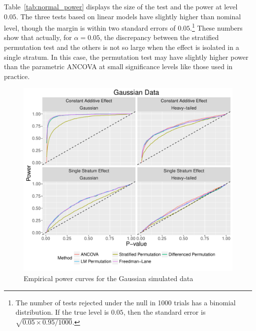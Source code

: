 \documentclass[11pt]{article}
\begin{document}
Table~\ref{tab:normal_power} displays the size of the test and the power at level $0.05$.
The three tests based on linear models have slightly higher than nominal level, though the margin is within two standard errors of $0.05$.\footnote{
The number of tests rejected under the null in 1000 trials has a binomial distribution.
If the true level is $0.05$, then the standard error is $\sqrt{0.05 \times 0.95/1000}$.}
These numbers show that actually, for $\alpha=0.05$, the discrepancy between the stratified permutation test and the others is not so large when the effect is isolated in a single stratum.
In this case, the permutation test may have slightly higher power than the parametric ANCOVA at small significance levels like those used in practice.
\begin{figure}[h]
\centering
\includegraphics[width = \textwidth]{fig/normal_simulation_power}
\caption{Empirical power curves for the Gaussian simulated data}
\label{fig:normal_sim_power}
\end{figure}
\begin{center}

\end{center}
\end{document}
